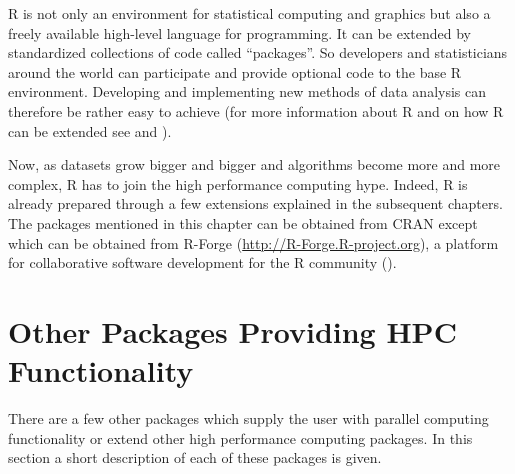 R is not only an environment for statistical computing and graphics
but also a freely available high-level language for programming. It
can be extended by standardized collections of code called
``packages''. So developers and statisticians around the world can
participate and provide optional code to the base R environment.
Developing and implementing new methods of data analysis can therefore
be rather easy to achieve (for more information about R and on how R can
be extended see \cite{hornik07Rfaq} and \cite{Rcore07Ext}). 


Now, as datasets grow bigger and bigger and algorithms become more and more
complex, R has to join the high performance computing hype. Indeed, R
is already prepared through a few extensions explained in the
subsequent chapters. The packages mentioned in this chapter can be
obtained from CRAN except  which can be obtained from
R-Forge (\url{http://R-Forge.R-project.org}), a platform for
collaborative software development for the R community
(\cite{theussl07R-Forge}).









\section{Other Packages Providing HPC Functionality}
\label{sec:otherpackages}
There are a few other packages which supply the user with parallel
computing functionality or extend other high performance computing
packages. In this section a short description of each of these
packages is given.

